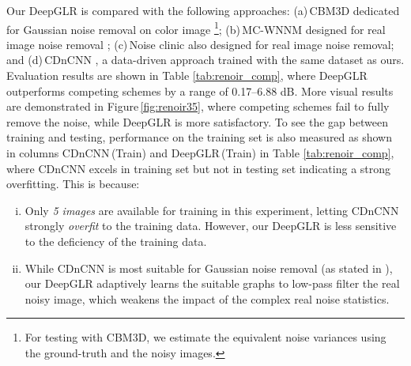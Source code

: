 \documentclass[10pt,twocolumn,letterpaper]{article}
\begin{document}
Our DeepGLR is compared with the following approaches: (a)\,CBM3D dedicated for Gaussian noise removal on color image \cite{dabov2007image}\footnote{For testing with CBM3D, we estimate the equivalent noise variances using the ground-truth and the noisy images.}; (b)\,MC-WNNM designed for real image noise removal \cite{xu2017multi}; (c)\,Noise clinic \cite{lebrun2015noise} also designed for real image noise removal; and (d)\,CDnCNN \cite{zhang2017beyond}, a data-driven approach trained with the same dataset as ours. Evaluation results are shown in Table \ref{tab:renoir_comp}, where DeepGLR outperforms competing schemes by a range of 0.17--6.88 dB. 
More visual results are demonstrated in Figure\,\ref{fig:renoir35}, where competing schemes fail to fully remove the noise, while DeepGLR is more satisfactory.
To see the gap between training and testing, performance on the training set is also measured as shown in columns CDnCNN\,(Train) and DeepGLR\,(Train) in Table \ref{tab:renoir_comp}, where CDnCNN excels in training set but not in testing set indicating a strong overfitting. 
This is because: 
\begin{enumerate}[(i)]
\item Only \emph{5 images} are available for training in this experiment, letting CDnCNN strongly \emph{overfit} to the training data. However, our DeepGLR is less sensitive to the deficiency of the training data.
\item While CDnCNN is most suitable for Gaussian noise removal (as stated in \cite{zhang2017beyond}), our DeepGLR adaptively learns the suitable graphs to low-pass filter the real noisy image, which weakens the impact of the complex real noise statistics.
\end{enumerate}
\end{document}
